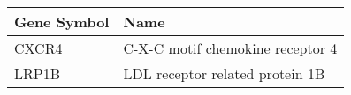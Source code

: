 \begin{tabular}{ll}
\toprule
Gene Symbol &                             Name \\
\midrule
      CXCR4 & C-X-C motif chemokine receptor 4 \\
      LRP1B &  LDL receptor related protein 1B \\
\bottomrule
\end{tabular}
